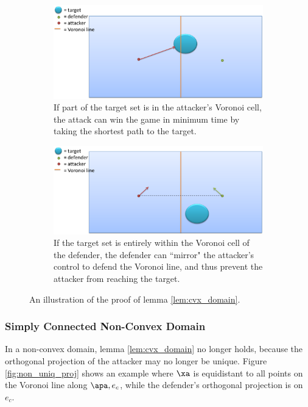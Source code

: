 \begin{figure}[h]
\centering
	\begin{subfigure}{0.45\textwidth}
	\centering
	\includegraphics[width=\textwidth]{"fig/cvx domain 1"}
	\caption{If part of the target set is in the attacker's Voronoi cell, the attack can win the game in minimum time by taking the shortest path to the target.}
	\end{subfigure} \quad
	\begin{subfigure}{0.45\textwidth}
	\centering
	\includegraphics[width=\textwidth]{"fig/cvx domain 2"}
	\caption{If the target set is entirely within the Voronoi cell of the defender, the defender can ``mirror" the attacker's control to defend the Voronoi line, and thus prevent the attacker from reaching the target.}
	\end{subfigure}
\caption{An illustration of the proof of lemma \ref{lem:cvx_domain}.}
\label{fig:cvx_domain}
\end{figure}

\subsubsection{Simply Connected Non-Convex Domain}
In a non-convex domain, lemma \ref{lem:cvx_domain} no longer holds, because the orthogonal projection of the attacker may no longer be unique. Figure \ref{fig:non_uniq_proj} shows an example where $\xa$ is equidistant to all points on the Voronoi line along $\apa,e_c$, while the defender's orthogonal projection is on $e_c$. 

